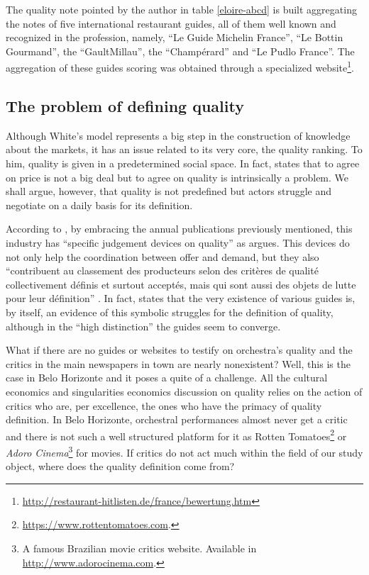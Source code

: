 \documentclass[a4paper, 12pt, openright, oneside, german, french, brazil, english, article]{abntex2}
\begin{document}
        The quality note pointed by the author in table \ref{eloire-abcd} is built aggregating the notes of five international restaurant guides, all of them well known and recognized in the profession, namely, ``Le Guide Michelin France'', ``Le Bottin Gourmand'', the ``GaultMillau'', the ``Champérard'' and ``Le Pudlo France''. The aggregation of these guides scoring was obtained through a specialized website\footnote{\url{http://restaurant-hitlisten.de/france/bewertung.htm}}.
        
	
	
	
	\subsection{The problem of defining quality}
	
	Although White's model represents a big step in the construction of knowledge about the markets, it has an issue related to its very core, the quality ranking. To him, quality is given in a predetermined social space. In fact,  states that to agree on price is not a big deal but to agree on quality is intrinsically a problem. We shall argue, however, that quality is not predefined but actors struggle and negotiate on a daily basis for its definition.

        According to , by embracing the annual publications previously mentioned, this industry has ``specific judgement devices on quality'' as   argues. This devices do not only help the coordination between offer and demand, but they also ``contribuent au classement des producteurs selon des critères de qualité collectivement définis et surtout acceptés, mais qui sont aussi des objets de lutte pour leur définition'' \cite[p. 494]{eloire2009reseaux}. In fact,  states that the very existence of various guides is, by itself, an evidence of this symbolic struggles for the definition of quality, although in the ``high distinction'' the guides seem to converge.

        What if there are no guides or websites to testify on orchestra's quality and the critics in the main newspapers in town are nearly nonexistent? Well, this is the case in Belo Horizonte and it poses a quite of a challenge. All the cultural economics and singularities economics discussion on quality relies on the action of critics who are, per excellence, the ones who have the primacy of quality definition. In Belo Horizonte, orchestral performances almost never get a critic and there is not such a well structured platform for it as Rotten Tomatoes\footnote{\url{https://www.rottentomatoes.com}.} or \textit{Adoro Cinema}\footnote{A famous Brazilian movie critics website. Available in \url{http://www.adorocinema.com}.} for movies. If critics do not act much within the field of our study object, where does the quality definition come from?
        
\end{document}
